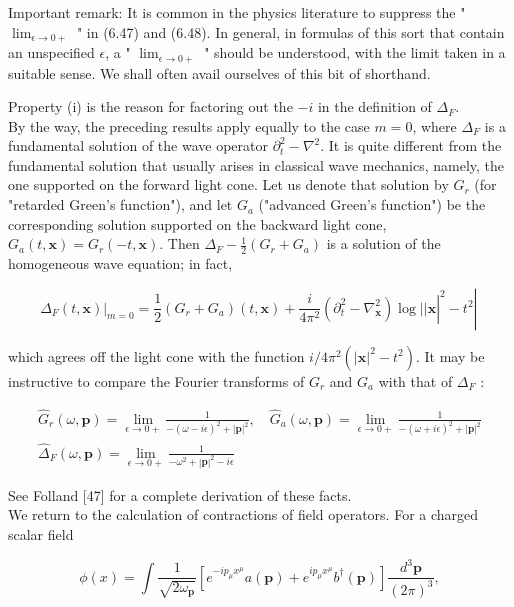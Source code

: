 \documentclass[10pt, letterpaper]{article}
\begin{document}
Important remark: It is common in the physics literature to suppress the " $\lim _{\epsilon \rightarrow 0+}$ " in (6.47) and (6.48). In general, in formulas of this sort that contain an unspecified $\epsilon$, a " $\lim _{\epsilon \rightarrow 0+}$ " should be understood, with the limit taken in a suitable sense. We shall often avail ourselves of this bit of shorthand.

Property (i) is the reason for factoring out the $-i$ in the definition of $\Delta_{F}$.\\
By the way, the preceding results apply equally to the case $m=0$, where $\Delta_{F}$ is a fundamental solution of the wave operator $\partial_{t}^{2}-\nabla^{2}$. It is quite different from the fundamental solution that usually arises in classical wave mechanics, namely, the one supported on the forward light cone. Let us denote that solution by $G_{r}$ (for "retarded Green's function"), and let $G_{a}$ ("advanced Green's function") be the corresponding solution supported on the backward light cone, $G_{a}(t, \mathbf{x})=G_{r}(-t, \mathbf{x})$. Then $\Delta_{F}-\frac{1}{2}\left(G_{r}+G_{a}\right)$ is a solution of the homogeneous wave equation; in fact,

$$
\left.\left.\Delta_{F}(t, \mathbf{x})\right|_{m=0}=\frac{1}{2}\left(G_{r}+G_{a}\right)(t, \mathbf{x})+\left.\frac{i}{4 \pi^{2}}\left(\partial_{t}^{2}-\nabla_{\mathbf{x}}^{2}\right) \log | | \mathbf{x}\right|^{2}-t^{2} \right\rvert\,
$$

which agrees off the light cone with the function $i / 4 \pi^{2}\left(|\mathbf{x}|^{2}-t^{2}\right)$. It may be instructive to compare the Fourier transforms of $G_{r}$ and $G_{a}$ with that of $\Delta_{F}$ :

$$
\begin{gathered}
\widehat{G}_{r}(\omega, \mathbf{p})=\lim _{\epsilon \rightarrow 0+} \frac{1}{-(\omega-i \epsilon)^{2}+|\mathbf{p}|^{2}}, \quad \widehat{G}_{a}(\omega, \mathbf{p})=\lim _{\epsilon \rightarrow 0+} \frac{1}{-(\omega+i \epsilon)^{2}+|\mathbf{p}|^{2}} \\
\widehat{\Delta}_{F}(\omega, \mathbf{p})=\lim _{\epsilon \rightarrow 0+} \frac{1}{-\omega^{2}+|\mathbf{p}|^{2}-i \epsilon}
\end{gathered}
$$

See Folland [47] for a complete derivation of these facts.\\
We return to the calculation of contractions of field operators. For a charged scalar field

$$
\phi(x)=\int \frac{1}{\sqrt{2 \omega_{\mathbf{p}}}}\left[e^{-i p_{\mu} x^{\mu}} a(\mathbf{p})+e^{i p_{\mu} x^{\mu}} b^{\dagger}(\mathbf{p})\right] \frac{d^{3} \mathbf{p}}{(2 \pi)^{3}},
$$
\end{document}
